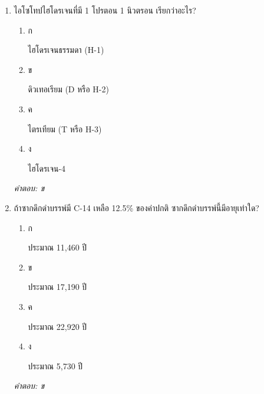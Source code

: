 \documentclass[12pt]{article}
\begin{document}
\begin{enumerate}[label=\arabic*., itemsep=0.5\baselineskip, topsep=0.5\baselineskip, leftmargin=*]
\item ไอโซโทปไฮโดรเจนที่มี 1 โปรตอน 1 นิวตรอน เรียกว่าอะไร?
\begin{enumerate}[label=\alph*)., itemsep=0.3\baselineskip, topsep=0.3\baselineskip]
\item ก\ 
\begin{minipage}[t]{0.9\linewidth}
\raggedright ไฮโดรเจนธรรมดา (H-1)
\end{minipage}
\item ข\ 
\begin{minipage}[t]{0.9\linewidth}
\raggedright ดิวเทอเรียม (D หรือ H-2)
\end{minipage}
\item ค\ 
\begin{minipage}[t]{0.9\linewidth}
\raggedright ไตรเทียม (T หรือ H-3)
\end{minipage}
\item ง\ 
\begin{minipage}[t]{0.9\linewidth}
\raggedright ไฮโดรเจน-4
\end{minipage}
\end{enumerate}
\vspace{-0.3\baselineskip}
\begin{small}
\textit{คำตอบ: ข}
\end{small}

\item ถ้าซากดึกดำบรรพ์มี C-14 เหลือ 12.5\% ของค่าปกติ ซากดึกดำบรรพ์นี้มีอายุเท่าใด?
\begin{enumerate}[label=\alph*)., itemsep=0.3\baselineskip, topsep=0.3\baselineskip]
\item ก\ 
\begin{minipage}[t]{0.9\linewidth}
\raggedright ประมาณ 11,460 ปี
\end{minipage}
\item ข\ 
\begin{minipage}[t]{0.9\linewidth}
\raggedright ประมาณ 17,190 ปี
\end{minipage}
\item ค\ 
\begin{minipage}[t]{0.9\linewidth}
\raggedright ประมาณ 22,920 ปี
\end{minipage}
\item ง\ 
\begin{minipage}[t]{0.9\linewidth}
\raggedright ประมาณ 5,730 ปี
\end{minipage}
\end{enumerate}
\vspace{-0.3\baselineskip}
\begin{small}
\textit{คำตอบ: ข}
\end{small}


\end{enumerate}
\end{document}
